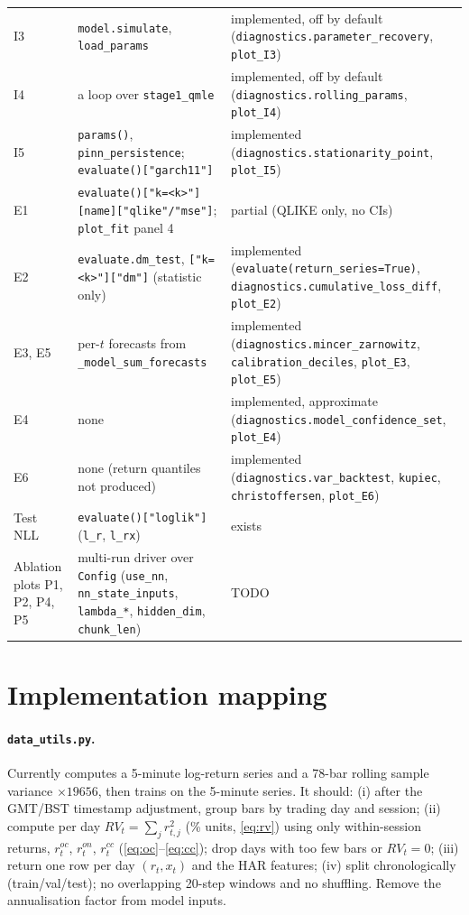 \documentclass[11pt]{article}
\begin{document}
{\begin{longtable}{p{3.2cm}p{8.4cm}p{2.6cm}}
I3 & \texttt{model.simulate}, \texttt{load\_params} & implemented, off by default (\texttt{diagnostics.parameter\_recovery}, \texttt{plot\_I3})\\
I4 & a loop over \texttt{stage1\_qmle} & implemented, off by default (\texttt{diagnostics.rolling\_params}, \texttt{plot\_I4})\\
I5 & \texttt{params()}, \texttt{pinn\_persistence}; \texttt{evaluate()["garch11"]} & implemented (\texttt{diagnostics.stationarity\_point}, \texttt{plot\_I5})\\
E1 & \texttt{evaluate()["k=<k>"][name]["qlike"/"mse"]}; \texttt{plot\_fit} panel 4 & partial (QLIKE only, no CIs)\\
E2 & \texttt{evaluate.dm\_test}, \texttt{["k=<k>"]["dm"]} (statistic only) & implemented (\texttt{evaluate(return\_series=True)}, \texttt{diagnostics.cumulative\_loss\_diff}, \texttt{plot\_E2})\\
E3, E5 & per-$t$ forecasts from \texttt{\_model\_sum\_forecasts} & implemented (\texttt{diagnostics.mincer\_zarnowitz}, \texttt{calibration\_deciles}, \texttt{plot\_E3}, \texttt{plot\_E5})\\
E4 & none & implemented, approximate (\texttt{diagnostics.model\_confidence\_set}, \texttt{plot\_E4})\\
E6 & none (return quantiles not produced) & implemented (\texttt{diagnostics.var\_backtest}, \texttt{kupiec}, \texttt{christoffersen}, \texttt{plot\_E6})\\
Test NLL & \texttt{evaluate()["loglik"]} (\texttt{l\_r}, \texttt{l\_rx}) & exists\\
Ablation plots P1, P2, P4, P5 & multi-run driver over \texttt{Config} (\texttt{use\_nn}, \texttt{nn\_state\_inputs}, \texttt{lambda\_*}, \texttt{hidden\_dim}, \texttt{chunk\_len}) & TODO\\
\bottomrule
\end{longtable}}

\section{Implementation mapping}
\paragraph{\texttt{data\_utils.py}.} Currently computes a 5-minute log-return series and a
78-bar rolling sample variance $\times19656$, then trains on the 5-minute series. It should:
(i) after the GMT/BST timestamp adjustment, group bars by trading day and session;
(ii) compute per day $RV_t=\sum_j r_{t,j}^2$ (\% units, \eqref{eq:rv}) using only within-session
returns, $r^{oc}_t$, $r^{on}_t$, $r^{cc}_t$ (\eqref{eq:oc}--\eqref{eq:cc}); drop days with too
few bars or $RV_t=0$; (iii) return one row per day $(r_t,x_t)$ and the HAR features;
(iv) split chronologically (train/val/test); no overlapping 20-step windows and no shuffling.
Remove the annualisation factor from model inputs.
\end{document}
